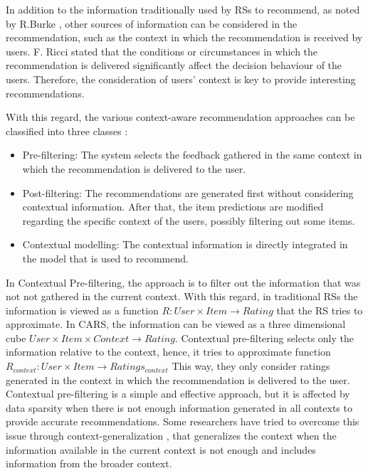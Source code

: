 \documentclass[preprint]{elsarticle}
\begin{document}
\begin{spacing}{2}
In addition to the information traditionally used by RSs to recommend, as noted by R.Burke \cite{Burke2002}, other sources of information can be considered in the recommendation, such as the context in which the recommendation is received by users. F. Ricci \cite{Ricci2012contextualizing} stated that the conditions or circumstances in which the recommendation is delivered significantly affect the decision behaviour of the users. Therefore, the consideration of users' context is key to provide interesting recommendations.

With this regard, the various context-aware recommendation approaches can be classified into three classes \cite{Adomavicius2011}:
\begin{itemize}
	\item Pre-filtering: The system selects the feedback gathered in the same context in which the recommendation is delivered to the user.
	\item Post-filtering: The recommendations are generated first without considering contextual information. After that, the item predictions are modified regarding the specific context of the users, possibly filtering out some items.
	\item Contextual modelling: The contextual information is directly integrated in the model that is used to recommend.
\end{itemize}

In Contextual Pre-filtering, the approach is to filter out the information that was not not gathered in the current context. With this regard, in traditional RSs the information is viewed as a function $R: User \times Item \rightarrow Rating $ that the RS tries to approximate. In CARS, the information can be viewed as a three dimensional cube $User \times Item \times Context \rightarrow Rating$. Contextual pre-filtering selects only the information relative to the context, hence, it tries to approximate function $R_{context}: User \times Item \rightarrow Ratings_{context}$ This way, they only consider ratings generated in the context in which the recommendation is delivered to the user. Contextual pre-filtering is a simple and effective approach, but it is affected by data sparsity when there is not enough information generated in all contexts to provide accurate recommendations. Some researchers have tried to overcome this issue through context-generalization \cite{Adomavicius2011}, that generalizes the context when the information available in the current context is not enough and includes information from the broader context.


\end{spacing}
\end{document}

